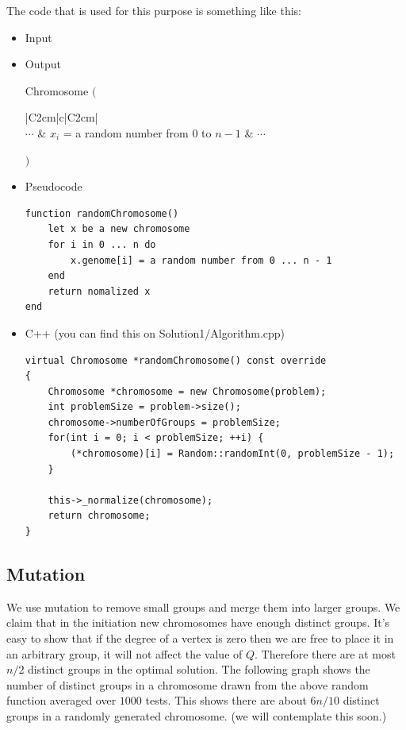 \documentclass{article}
\newcommand{\textbigl}[1]{$\Bigg#1$\nobreak}
\newcommand{\textbigr}[1]{\nobreak$\Bigg#1$}
\begin{document}
The code that is used for this purpose is something like this: 

\begin{itemize}

\item Input

\item Output

Chromosome
\textbigl(
\begin{tabular}{|C{2cm}|c|C{2cm}|}
\hline
{} \\\hline
$\cdots$ & $x_i$ = a random number from $0$ to $n - 1$ & $\cdots$ \\\hline
\end{tabular}
\textbigr)

\item Pseudocode
\begin{lstlisting}[style=lua]
function randomChromosome()
	let x be a new chromosome
	for i in 0 ... n do
		x.genome[i] = a random number from 0 ... n - 1
	end
	return nomalized x
end

\end{lstlisting}


\item C++ (you can find this on Solution1/Algorithm.cpp)

\begin{lstlisting}
virtual Chromosome *randomChromosome() const override
{
    Chromosome *chromosome = new Chromosome(problem);
    int problemSize = problem->size();
    chromosome->numberOfGroups = problemSize;
    for(int i = 0; i < problemSize; ++i) {
        (*chromosome)[i] = Random::randomInt(0, problemSize - 1);
    }

    this->_normalize(chromosome);
    return chromosome;
}
\end{lstlisting}
\end{itemize}

\subsection*{Mutation}
 We use mutation to remove small groups and merge them into larger groups. We claim that in the initiation new chromosomes have enough distinct groups. It's easy to show that if the degree of a vertex is zero then we are free to place it in an arbitrary group, it will not affect the value of $Q$. Therefore there are at most $n / 2$ distinct groups in the optimal solution. The following graph shows the number of distinct groups in a chromosome drawn from the above random function averaged over $1000$ tests. This shows there are about $6n / 10$ distinct groups in a randomly generated chromosome. (we will contemplate this soon.)
\end{document}
